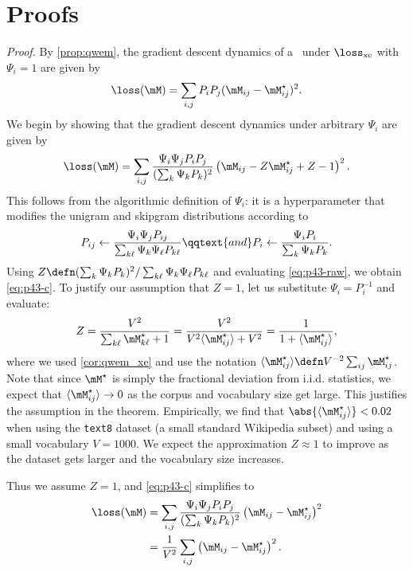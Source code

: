 \section{Proofs}
\label{appdx:proofs}

\sigmoidal*

\textit{Proof.} By \cref{prop:qwem}, the gradient descent dynamics of a \wem\ under $\lossxe$ with $\Psi_i=1$ are given by
\begin{equation}
    \loss(\M) = \sum_{i,j}P_iP_j(\M_{ij}-\Mstar_{ij})^2.
    \label{eq:p43-raw}
\end{equation}
We begin by showing that the gradient descent dynamics under arbitrary $\Psi_i$ are given by
\begin{equation}
    \loss(\M) = \sum_{i,j}\frac{\Psi_i \Psi_j P_i P_j}{(\sum_k\Psi_kP_k)^2}\left(\M_{ij}-Z\Mstar_{ij}+Z-1\right)^2.
    \label{eq:p43-c}
\end{equation}
This follows from the algorithmic definition of $\Psi_i$: it is a hyperparameter that modifies the unigram and skipgram distributions according to
\begin{equation}
    P_{ij} \gets \frac{\Psi_i \Psi_j P_{ij}}{\sum_{k\ell}{\Psi_k \Psi_\ell P_{k\ell}}} \qqtext{and} P_{i} \gets \frac{\Psi_i P_{i}}{\sum_{k}{\Psi_k P_{k}}}.
\end{equation}
Using $Z\defn (\sum_k\Psi_kP_k)^2/\sum_{k\ell} \Psi_k \Psi_\ell P_{k\ell}$ and evaluating \cref{eq:p43-raw}, we obtain \cref{eq:p43-c}. To justify our assumption that $Z=1$, let us substitute $\Psi_i=P_i^{-1}$ and evaluate:
\begin{equation}
    Z = \frac{V^2}{\sum_{k\ell} \Mstar_{k\ell}+1} = \frac{V^2}{V^2 \langle\Mstar_{ij}\rangle +V^2} = \frac{1}{1+\langle\Mstar_{ij}\rangle},
\end{equation}
where we used \cref{cor:qwem_xe} and use the notation $\langle\Mstar_{ij}\rangle\defn V^{-2}\sum_{ij}\Mstar_{ij}$. Note that since $\Mstar$ is simply the fractional deviation from i.i.d. statistics, we expect that $\langle\Mstar_{ij}\rangle\to 0$ as the corpus and vocabulary size get large. This justifies the assumption in the theorem. Empirically, we find that $\abs{\langle\Mstar_{ij}\rangle} < 0.02$ when using the \texttt{text8} dataset (a small standard Wikipedia subset) and using a small vocabulary $V=1000$. We expect the approximation $Z\approx 1$ to improve as the dataset gets larger and the vocabulary size increases.

Thus we assume $Z=1$, and \cref{eq:p43-c} simplifies to
\begin{align}
    \loss(\M) &= \sum_{i,j}\frac{\Psi_i \Psi_j P_i P_j}{(\sum_k\Psi_kP_k)^2}\left(\M_{ij}-\Mstar_{ij}\right)^2 \\
    &= \frac{1}{V^2}\sum_{i,j} \left(\M_{ij}-\Mstar_{ij}\right)^2.
\end{align}

